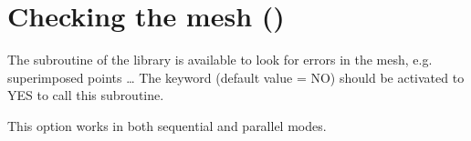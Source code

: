\section{Checking the mesh ()}

The  subroutine of the \bief library is available to look for
errors in the mesh, e.g. superimposed points \ldots
The keyword  (default value = NO) should be activated
to YES to call this subroutine.

This option works in both sequential and parallel modes.
